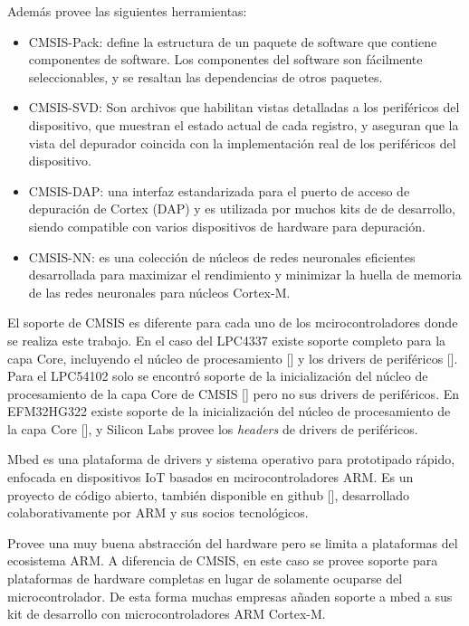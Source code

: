 Además provee las siguientes herramientas:

\begin{itemize}
\item
CMSIS-Pack: define la estructura de un paquete de software que contiene componentes de software. Los componentes del software son fácilmente seleccionables, y se resaltan las dependencias de otros paquetes.
\item
CMSIS-SVD: Son archivos que habilitan vistas detalladas a los periféricos del dispositivo, que muestran el estado actual de cada registro, y aseguran que la vista del depurador coincida con la implementación real de los periféricos del dispositivo.
\item
CMSIS-DAP: una interfaz estandarizada para el puerto de acceso de depuración de Cortex (DAP) y es utilizada por muchos kits de de desarrollo, siendo compatible con varios dispositivos de hardware para depuración.
\item
CMSIS-NN: es una colección de núcleos de redes neuronales eficientes desarrollada para maximizar el rendimiento y minimizar la huella de memoria de las redes neuronales para núcleos Cortex-M.
\end{itemize}

El soporte de CMSIS es diferente para cada uno de los mcirocontroladores donde se realiza este trabajo. En el caso del LPC4337 existe soporte completo para la capa Core, incluyendo el núcleo de procesamiento [] y los drivers de periféricos []. Para el LPC54102 solo se encontró soporte de la inicialización del núcleo de procesamiento de la capa Core de CMSIS [] pero no sus drivers de periféricos. En EFM32HG322 existe soporte de la inicialización del núcleo de procesamiento de la capa Core [], y Silicon Labs provee los \emph{headers} de drivers de periféricos.


Mbed es una plataforma de drivers y sistema operativo para prototipado rápido, enfocada en dispositivos IoT basados en mcirocontroladores ARM. Es un proyecto de código abierto, también disponible en github [], desarrollado colaborativamente por ARM y sus socios tecnológicos.

Provee una muy buena abstracción del hardware pero se limita a plataformas del ecosistema ARM. A diferencia de CMSIS, en este caso se provee soporte para plataformas de hardware completas en lugar de solamente ocuparse del microcontrolador. De esta forma muchas empresas añaden soporte a mbed a sus kit de desarrollo con microcontroladores ARM Cortex-M. 

